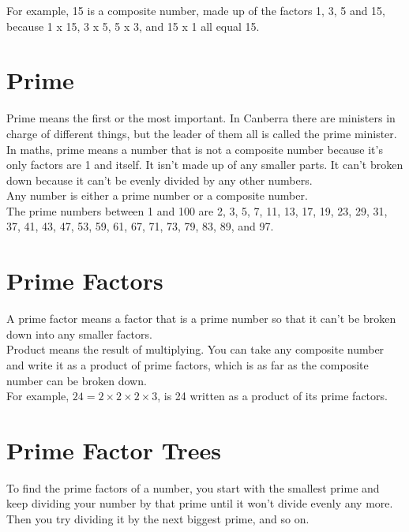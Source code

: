 \documentclass{article}
\begin{document}
For example, 15 is a composite number, made up of the factors 1, 3, 5 and 15, because 1 x 15, 3 x 5, 5 x 3, and 15 x 1 all equal 15.\\

\pagebreak

\section*{Prime}
Prime means the first or the most important. In Canberra there are ministers in charge of different things, but the leader of them all is called the prime minister.\\

In maths, prime means a number that is not a composite number because it’s only factors are 1 and itself. It isn’t made up of any smaller parts. It can’t broken down because it can’t be evenly divided by any other numbers.\\

Any number is either a prime number or a composite number.\\

The prime numbers between 1 and 100 are 2, 3, 5, 7, 11, 13, 17, 19, 23, 29, 31, 37, 41, 43, 47, 53, 59, 61, 67, 71, 73, 79, 83, 89, and 97.

\pagebreak

\section*{Prime Factors}
A prime factor means a factor that is a prime number so that it can’t be broken down into any smaller factors.\\

Product means the result of multiplying. You can take any composite number and write it as a product of prime factors, which is as far as the composite number can be broken down.\\

For example, $24 = 2 \times 2 \times 2 \times 3$, is 24 written as a product of its prime factors.

\pagebreak

\section*{Prime Factor Trees}

To find the prime factors of a number, you start with the smallest prime and keep dividing your number by that prime until it won’t divide evenly any more. Then you try dividing it by the next biggest prime, and so on.\\
\end{document}
